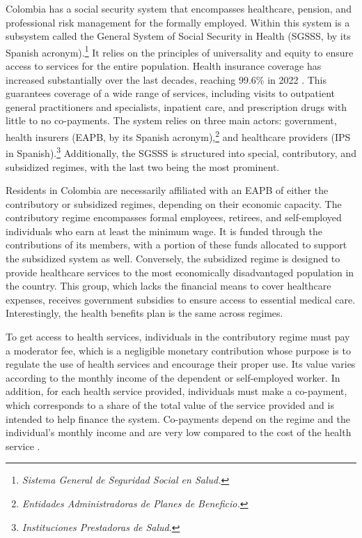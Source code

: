 \documentclass[12pt, a4paper]{article}
\begin{document}
Colombia has a social security system that encompasses healthcare, pension, and professional risk management for the formally employed. Within this system is a subsystem called the General System of Social Security in Health (SGSSS, by its Spanish acronym).\footnote{\textit{Sistema General de Seguridad Social en Salud.}} It relies on the principles of universality and equity to ensure access to services for the entire population. Health insurance coverage has increased substantially over the last decades, reaching 99.6\% in 2022 \citep{Minsalud2022}. This guarantees coverage of a wide range of services, including visits to outpatient general practitioners and specialists, inpatient care, and prescription drugs with little to no co-payments. The system relies on three main actors: government, health insurers (EAPB, by its Spanish acronym),\footnote{\textit{Entidades Administradoras de Planes de Beneficio.}} and healthcare providers (IPS in Spanish).\footnote{\textit{Instituciones Prestadoras de Salud}.} Additionally, the SGSSS is structured into special, contributory, and subsidized regimes, with the last two being the most prominent.

Residents in Colombia are necessarily affiliated with an EAPB of either the contributory or subsidized regimes, depending on their economic capacity. The contributory regime encompasses formal employees, retirees, and self-employed individuals who earn at least the minimum wage. It is funded through the contributions of its members, with a portion of these funds allocated to support the subsidized system as well. Conversely, the subsidized regime is designed to provide healthcare services to the most economically disadvantaged population in the country. This group, which lacks the financial means to cover healthcare expenses, receives government subsidies to ensure access to essential medical care. Interestingly, the health benefits plan is the same across regimes.

To get access to health services, individuals in the contributory regime must pay a moderator fee, which is a negligible monetary contribution whose purpose is to regulate the use of health services and encourage their proper use. Its value varies according to the monthly income of the dependent or self-employed worker. In addition, for each health service provided, individuals must make a co-payment, which corresponds to a share of the total value of the service provided and is intended to help finance the system. Co-payments depend on the regime and the individual's monthly income and are very low compared to the cost of the health service \citep{Aseguramiento}.
\end{document}
